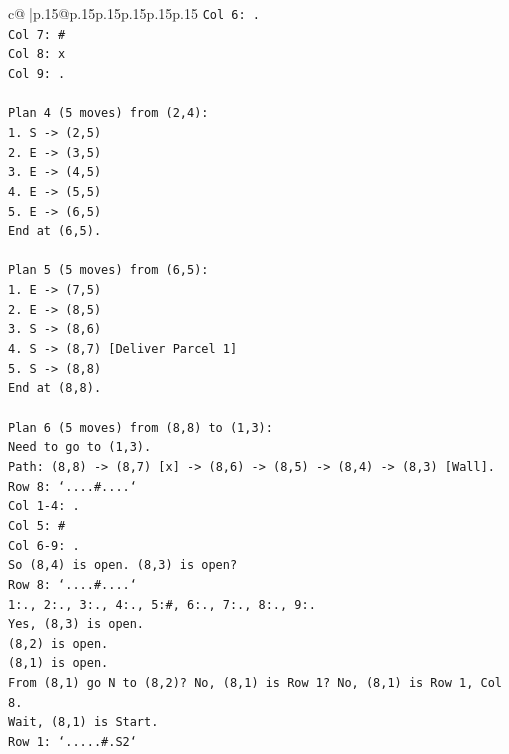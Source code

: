 \documentclass{article}
\begin{document}
{\begin{supertabular}{c@{$\;$}|p{.15\linewidth}@{}p{.15\linewidth}p{.15\linewidth}p{.15\linewidth}p{.15\linewidth}p{.15\linewidth}}
{{{\texttt{Col 6: .} \\
\texttt{Col 7: \#} \\
\texttt{Col 8: x} \\
\texttt{Col 9: .} \\
\\ 
\texttt{Plan 4 (5 moves) from (2,4):} \\
\texttt{1. S {-}> (2,5)} \\
\texttt{2. E {-}> (3,5)} \\
\texttt{3. E {-}> (4,5)} \\
\texttt{4. E {-}> (5,5)} \\
\texttt{5. E {-}> (6,5)} \\
\texttt{End at (6,5).} \\
\\ 
\texttt{Plan 5 (5 moves) from (6,5):} \\
\texttt{1. E {-}> (7,5)} \\
\texttt{2. E {-}> (8,5)} \\
\texttt{3. S {-}> (8,6)} \\
\texttt{4. S {-}> (8,7) {[}Deliver Parcel 1{]}} \\
\texttt{5. S {-}> (8,8)} \\
\texttt{End at (8,8).} \\
\\ 
\texttt{Plan 6 (5 moves) from (8,8) to (1,3):} \\
\texttt{Need to go to (1,3).} \\
\texttt{Path: (8,8) {-}> (8,7) {[}x{]} {-}> (8,6) {-}> (8,5) {-}> (8,4) {-}> (8,3) {[}Wall{]}.} \\
\texttt{Row 8: `....\#....`} \\
\texttt{Col 1{-}4: .} \\
\texttt{Col 5: \#} \\
\texttt{Col 6{-}9: .} \\
\texttt{So (8,4) is open. (8,3) is open?} \\
\texttt{Row 8: `....\#....`} \\
\texttt{1:., 2:., 3:., 4:., 5:\#, 6:., 7:., 8:., 9:.} \\
\texttt{Yes, (8,3) is open.} \\
\texttt{(8,2) is open.} \\
\texttt{(8,1) is open.} \\
\texttt{From (8,1) go N to (8,2)? No, (8,1) is Row 1? No, (8,1) is Row 1, Col 8.} \\
\texttt{Wait, (8,1) is Start.} \\
\texttt{Row 1: `.....\#.S2`} \\
}}}
\end{supertabular}}
\end{document}
